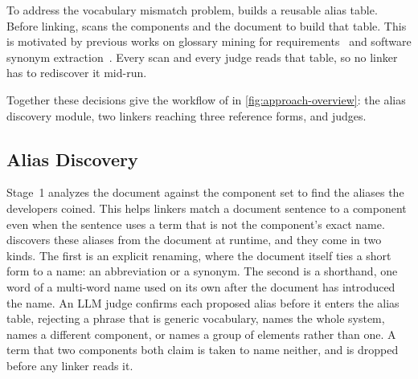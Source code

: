 To address the vocabulary mismatch problem, \approach builds a reusable alias table.
Before linking, \approach scans the components and the document to build that table.
This is motivated by previous works on glossary mining for requirements~\cite{arora2017automated,gemkow2018automatic} and software synonym extraction~\cite{howard2013automatically,falleri2010automatic}.
Every scan and every judge reads that table, so no linker has to rediscover it mid-run.

Together these decisions give the workflow of \approach in \autoref{fig:approach-overview}: the alias discovery module, two linkers reaching three reference forms, and \evidenceBacked judges.

\subsection{Alias Discovery}\label{sec:doc-understanding}
Stage~1 analyzes the document against the component set to find the aliases the developers coined.
This helps linkers match a document sentence to a component even when the sentence uses a term that is not the component's exact name.
\approach discovers these aliases from the document at runtime, and they come in two kinds.
The first is an explicit renaming, where the document itself ties a short form to a name: an abbreviation or a synonym.
The second is a shorthand, one word of a multi-word name used on its own after the document has introduced the name.
An \ac{LLM} judge confirms each proposed alias before it enters the alias table, rejecting a phrase that is generic vocabulary, names the whole system, names a different component, or names a group of elements rather than one.
A term that two components both claim is taken to name neither, and is dropped before any linker reads it.

